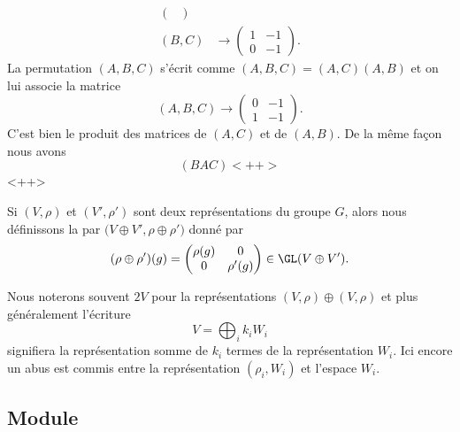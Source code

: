 \begin{example}
\begin{subequations}
\begin{align}
\begin{pmatrix}
            \end{pmatrix}\\
            (B,C)&\to\begin{pmatrix}
                1    &   -1    \\ 
                0    &   -1    
            \end{pmatrix}.
        \end{align}
    \end{subequations}
    La permutation \( (A,B,C)\) s'écrit comme \( (A,B,C)=(A,C)(A,B)\) et on lui associe la matrice
    \begin{equation}
        (A,B,C)\to\begin{pmatrix}
            0    &   -1    \\ 
            1    &   -1    
        \end{pmatrix}.
    \end{equation}
    C'est bien le produit des matrices de \( (A,C)\) et de \( (A,B)\). De la même façon nous avons
    \begin{equation}
        (BAC)<++>
    \end{equation}
    <++>
\end{example}

Si \( (V,\rho)\) et \( (V',\rho')\) sont deux représentations du groupe \( G\), alors nous définissons la  par \( \big( V\oplus V',\rho\oplus\rho' \big)\) donné par
\begin{equation}
    (\rho\oplus\rho')(g)=\begin{pmatrix}
        \rho(g)    &   0    \\ 
        0    &   \rho'(g)    
    \end{pmatrix}\in \GL(V\oplus V').
\end{equation}

Nous noterons souvent \( 2V\) pour la représentations \( (V,\rho)\oplus (V,\rho)\) et plus généralement l'écriture
\begin{equation}
    V=\bigoplus_i k_iW_i
\end{equation}
signifiera la représentation somme de \( k_i\) termes de la représentation \( W_i\). Ici encore un abus est commis entre la représentation \( (\rho_i,W_i)\) et l'espace \( W_i\).

\subsection{Module}

